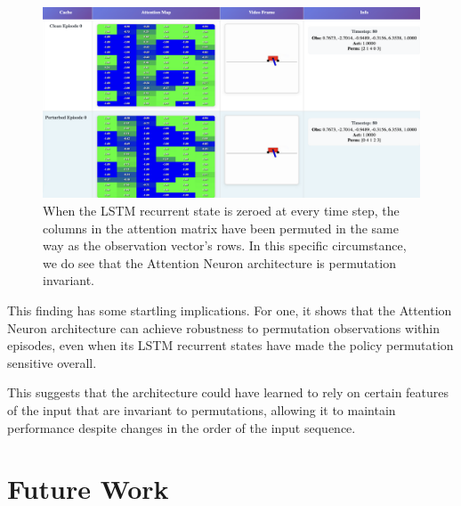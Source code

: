 \documentclass{article}
\begin{document}
\begin{figure}[h]
    \centering
    \includegraphics[width=\textwidth]{images/is_perm_iv.png}
    \caption{When the LSTM recurrent state is zeroed at every time step, the columns in the attention matrix have been permuted in the same way as the observation vector's rows. 
    In this specific circumstance, we do see that the Attention Neuron architecture is permutation invariant.}
    \label{fig:attention_neuron_permutation_invariance_zeroed_lstm}
\end{figure}

This finding has some startling implications.
For one, it shows that the Attention Neuron architecture
can achieve robustness to permutation observations within episodes,
even when its LSTM recurrent states have made the policy permutation sensitive overall.

This suggests that the architecture could have learned to rely on certain features of the input
that are invariant to permutations, allowing it to maintain performance despite changes
in the order of the input sequence.

\section{Future Work}

\end{document}
